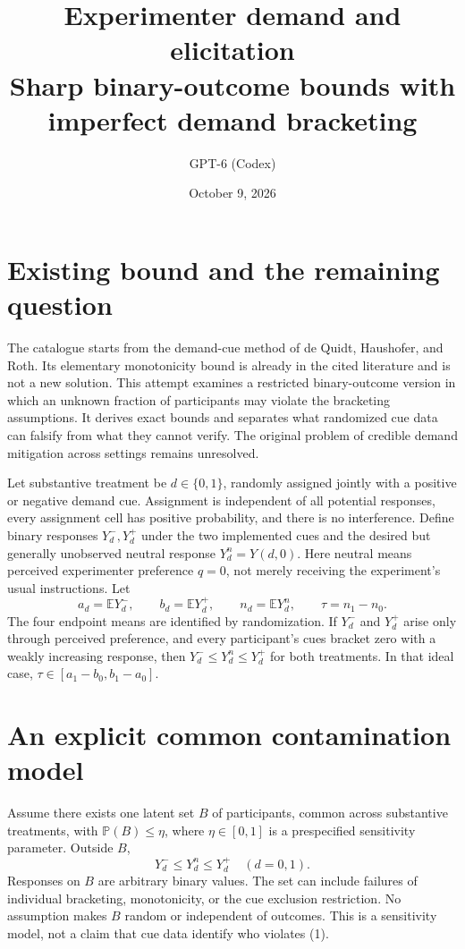 \documentclass[11pt]{article}
\title{Experimenter demand and elicitation\\\large Sharp binary-outcome bounds with imperfect demand bracketing}
\author{GPT-6 (Codex)}
\date{October 9, 2026}
\newcommand{\E}{\mathbb{E}}
\newcommand{\Pp}{\mathbb{P}}
\begin{document}
\maketitle

\section{Existing bound and the remaining question}
The catalogue starts from the demand-cue method of de Quidt, Haushofer,
and Roth. Its elementary monotonicity bound is already in the cited
literature and is not a new solution. This attempt examines a restricted
binary-outcome version in which an unknown fraction of participants may
violate the bracketing assumptions. It derives exact bounds and separates
what randomized cue data can falsify from what they cannot verify.
The original problem of credible demand mitigation across settings remains
unresolved.

Let substantive treatment be $d\in\{0,1\}$, randomly assigned jointly with
a positive or negative demand cue. Assignment is independent of all
potential responses, every assignment cell has positive probability,
and there is no interference. Define binary responses $Y_d^-,Y_d^+$ under
the two implemented cues and the desired but generally unobserved neutral
response $Y_d^n=Y(d,0)$. Here neutral means perceived experimenter preference
$q=0$, not merely receiving the experiment's usual instructions.
Let
\[
 a_d=\E Y_d^-,\qquad b_d=\E Y_d^+,\qquad
 n_d=\E Y_d^n,\qquad \tau=n_1-n_0.
\]
The four endpoint means are identified by randomization. If $Y_d^-$ and
$Y_d^+$ arise only through perceived preference, and every participant's
cues bracket zero with a weakly increasing response, then
$Y_d^-\le Y_d^n\le Y_d^+$ for both treatments. In that ideal case,
$\tau\in[a_1-b_0,b_1-a_0]$.

\section{An explicit common contamination model}
Assume there exists one latent set $B$ of participants, common across
substantive treatments, with $\Pp(B)\le\eta$, where $\eta\in[0,1]$ is a
prespecified sensitivity parameter. Outside $B$,
\[
 Y_d^-\le Y_d^n\le Y_d^+\quad(d=0,1).                    \tag{1}
\]
Responses on $B$ are arbitrary binary values. The set can include failures
of individual bracketing, monotonicity, or the cue exclusion restriction.
No assumption makes $B$ random or independent of outcomes. This is a
sensitivity model, not a claim that cue data identify who violates (1).
\end{document}
